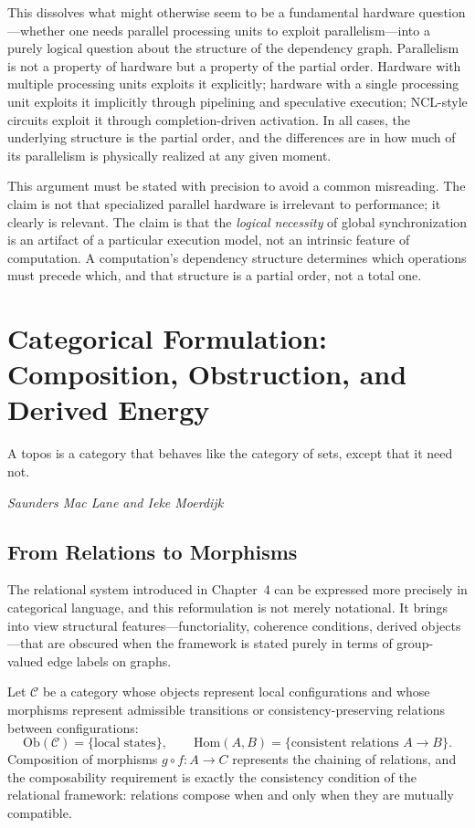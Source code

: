 \documentclass[12pt,a4paper,openany]{book}
\theoremstyle{plain}
\theoremstyle{definition}
\theoremstyle{remark}
\begin{document}
This dissolves what might otherwise seem to be a fundamental hardware question---whether one needs parallel processing units to exploit parallelism---into a purely logical question about the structure of the dependency graph. Parallelism is not a property of hardware but a property of the partial order. Hardware with multiple processing units exploits it explicitly; hardware with a single processing unit exploits it implicitly through pipelining and speculative execution; NCL-style circuits exploit it through completion-driven activation. In all cases, the underlying structure is the partial order, and the differences are in how much of its parallelism is physically realized at any given moment.

This argument must be stated with precision to avoid a common misreading. The claim is not that specialized parallel hardware is irrelevant to performance; it clearly is relevant. The claim is that the \emph{logical necessity} of global synchronization is an artifact of a particular execution model, not an intrinsic feature of computation. A computation's dependency structure determines which operations must precede which, and that structure is a partial order, not a total one.

\chapter{Categorical Formulation: Composition, Obstruction, and Derived Energy}

\epigraph{%
  A topos is a category that behaves like the category of sets,
  except that it need not.
}{%
  \textit{Saunders Mac Lane and Ieke Moerdijk}}

\section{From Relations to Morphisms}

The relational system introduced in Chapter~4 can be expressed more precisely in categorical language, and this reformulation is not merely notational. It brings into view structural features---functoriality, coherence conditions, derived objects---that are obscured when the framework is stated purely in terms of group-valued edge labels on graphs.

Let $\mathcal{C}$ be a category whose objects represent local configurations and whose morphisms represent admissible transitions or consistency-preserving relations between configurations:
\[
\mathrm{Ob}(\mathcal{C}) = \bigl\{ \text{local states} \bigr\}, \qquad \mathrm{Hom}(A, B) = \bigl\{ \text{consistent relations } A \to B \bigr\}.
\]
Composition of morphisms $g \circ f : A \to C$ represents the chaining of relations, and the composability requirement is exactly the consistency condition of the relational framework: relations compose when and only when they are mutually compatible.
\end{document}

